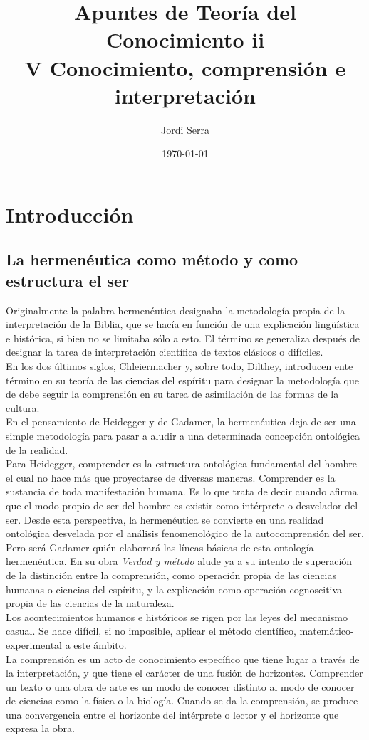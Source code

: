 \documentclass[a4paper, 11pt, twocolumn, spanish]{article}
\author{Jordi Serra}
\date{\today}
\title{Apuntes de Teoría del Conocimiento ii\\\medskip
\large V Conocimiento, comprensión e interpretación}
\begin{document}
\maketitle
\tableofcontents


\section{Introducción}
\label{sec:org2d096a2}
\subsection{La hermenéutica como método y como estructura el ser}
\label{sec:orgeb5dc76}
Originalmente la palabra hermenéutica designaba la metodología propia
de la interpretación de la Biblia, que se hacía en función de una
explicación lingüística e histórica, si bien no se limitaba sólo a
esto. El término se generaliza después de designar la tarea de
interpretación científica de textos clásicos o difíciles.\\[0pt]

En los dos últimos siglos, Chleiermacher y, sobre todo, Dilthey,
introducen ente término en su teoría de las ciencias del espíritu para
designar la metodología que de debe seguir la comprensión en su tarea
de asimilación de las formas de la cultura.\\[0pt]
En el pensamiento de Heidegger y de Gadamer, la hermenéutica deja de
ser una simple metodología para pasar a aludir a una determinada
concepción ontológica de la realidad.\\[0pt]

Para Heidegger, comprender es la estructura ontológica fundamental del
hombre el cual no hace más que proyectarse de diversas
maneras. Comprender es la sustancia de toda manifestación humana. Es
lo que trata de decir cuando afirma que el modo propio de ser del
hombre es existir como intérprete o desvelador del ser. Desde esta
perspectiva, la hermenéutica se convierte en una realidad ontológica
desvelada por el análisis fenomenológico de la autocomprensión del ser.\\[0pt]

Pero será Gadamer quién elaborará las líneas básicas de esta
ontología hermenéutica. En su obra \emph{Verdad y método} alude ya a su
intento de superación de la distinción entre la comprensión, como
operación propia de las ciencias humanas o ciencias del espíritu, y la
explicación como operación cognoscitiva propia de las ciencias de la
naturaleza.\\[0pt]
Los acontecimientos humanos e históricos se rigen por las leyes del
mecanismo casual. Se hace difícil, si no imposible, aplicar el método
científico, matemático-experimental a este ámbito.\\[0pt]
La comprensión es un acto de conocimiento específico que tiene lugar a
través de la interpretación, y que tiene el carácter de una fusión de
horizontes. Comprender un texto o una obra de arte es un modo de
conocer distinto al modo de conocer de ciencias como la física o la
biología. Cuando se da la comprensión, se produce una convergencia
entre el horizonte del intérprete o lector y el horizonte que expresa
la obra.
\end{document}
